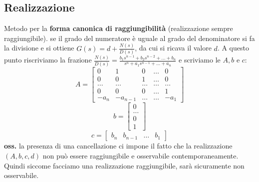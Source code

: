\begin{landscape}
    \subsection*{Realizzazione}
    Metodo per la \textbf{forma canonica di raggiungibilità} (realizzazione sempre raggiungibile).
    se il grado del numeratore è uguale al grado del denominatore si fa la divisione e si ottiene $G(s) = d + \frac{N(s)}{D(s)}$, da cui si ricava il valore $d$. A questo punto riscriviamo la frazione $\frac{N(s)}{D(s)} = \frac{ b_1 s^{n-1} + b_2 s^{n-2} + \dots + b_n }{ s^n + a_1 s^{n-1} + \dots + a_n }$ e scriviamo le $A, b$ e $c$:
    \[
        A=\left[\begin{matrix}
            0 & 1 & 0 & \dots & 0 \\
            0 & 0 & 1 & \dots & 0 \\
            \dots & \dots &\dots&\dots&\dots\\
            0 & 0 & 0 & \dots & 1\\
            -a_n & -a_{n-1} & \dots & \dots & -a_1
        \end{matrix}\right]
    \]
    \[
        b=\left[\begin{matrix}
            0\\\dots\\0\\1
        \end{matrix}\right]
    \]
    \[
        c=\left[\begin{matrix}
            b_n & b_{n-1} & \dots & b_1
        \end{matrix}\right]
    \]
    \textbf{oss.} la presenza di una cancellazione ci impone il fatto che la realizzazione
    $ (A, b, c, d)$ non può essere raggiungibile e osservabile contemporaneamente. Quindi siccome facciamo una realizzazione raggiungibile, sarà sicuramente non osservabile.

\end{landscape}

